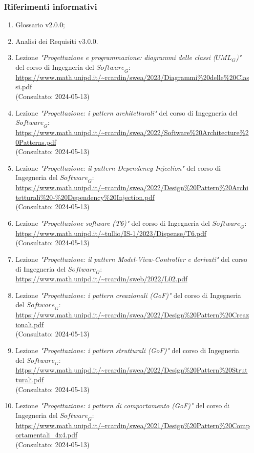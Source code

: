 \subsubsection{Riferimenti informativi}
\begin{enumerate}
    \item Glossario v2.0.0;
    \item Analisi dei Requisiti v3.0.0.
    \item Lezione \emph{"Progettazione e programmazione: diagrammi delle classi ($\textit{UML}_G$)"} del corso di Ingegneria del $\textit{Software}_G$:\\
    \url{https://www.math.unipd.it/~rcardin/swea/2023/Diagrammi%20delle%20Classi.pdf}\\
    (Consultato: 2024-05-13)
    \item Lezione \emph{"Progettazione: i pattern architetturali"} del corso di Ingegneria del $\textit{Software}_G$:\\
    \url{https://www.math.unipd.it/~rcardin/swea/2022/Software%20Architecture%20Patterns.pdf}\\
    (Consultato: 2024-05-13)
    \item Lezione \emph{"Progettazione: il pattern Dependency Injection"} del corso di Ingegneria del $\textit{Software}_G$:\\
    \url{https://www.math.unipd.it/~rcardin/swea/2022/Design%20Pattern%20Architetturali%20-%20Dependency%20Injection.pdf}\\
    (Consultato: 2024-05-13)
    \item Lezione \emph{"Progettazione software (T6)"} del corso di Ingegneria del $\textit{Software}_G$:\\
    \url{https://www.math.unipd.it/~tullio/IS-1/2023/Dispense/T6.pdf}\\
    (Consultato: 2024-05-13)
    \item Lezione \emph{"Progettazione: il pattern Model-View-Controller e derivati"} del corso di Ingegneria del $\textit{Software}_G$:\\
    \url{https://www.math.unipd.it/~rcardin/sweb/2022/L02.pdf}
    \item Lezione \emph{"Progettazione: i pattern creazionali (GoF)"} del corso di Ingegneria del $\textit{Software}_G$:\\
    \url{https://www.math.unipd.it/~rcardin/swea/2022/Design%20Pattern%20Creazionali.pdf}\\
    (Consultato: 2024-05-13)
    \item Lezione \emph{"Progettazione: i pattern strutturali (GoF)"} del corso di Ingegneria del $\textit{Software}_G$:\\
    \url{https://www.math.unipd.it/~rcardin/swea/2022/Design%20Pattern%20Strutturali.pdf}\\
    (Consultato: 2024-05-13)
    \item Lezione \emph{"Progettazione: i pattern di comportamento (GoF)"} del corso di Ingegneria del $\textit{Software}_G$:\\
    \url{https://www.math.unipd.it/~rcardin/swea/2021/Design%20Pattern%20Comportamentali_4x4.pdf}\\
    (Consultato: 2024-05-13)
    

\end{enumerate}

